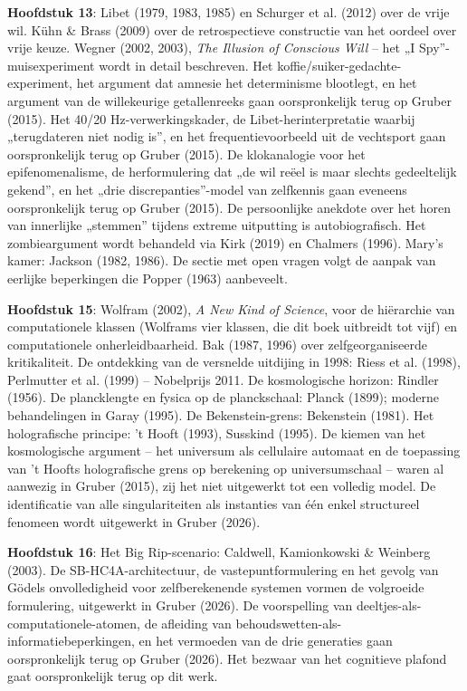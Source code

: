 \documentclass[11pt, twoside, openright]{book}
\begin{document}
\textbf{Hoofdstuk 13}: Libet (1979, 1983, 1985) en Schurger et al. (2012) over de vrije wil. Kühn \& Brass (2009) over de retrospectieve constructie van het oordeel over vrije keuze. Wegner (2002, 2003), \textit{The Illusion of Conscious Will} -- het „I Spy”-muisexperiment wordt in detail beschreven. Het koffie/\allowbreak{}suiker-gedachte-experiment, het argument dat amnesie het determinisme blootlegt, en het argument van de willekeurige getallenreeks gaan oorspronkelijk terug op Gruber (2015). Het 40/\allowbreak{}20 Hz-verwerkingskader, de Libet-herinterpretatie waarbij „terugdateren niet nodig is”, en het frequentievoorbeeld uit de vechtsport gaan oorspronkelijk terug op Gruber (2015). De klokanalogie voor het epifenomenalisme, de herformulering dat „de wil reëel is maar slechts gedeeltelijk gekend”, en het „drie discrepanties”-model van zelfkennis gaan eveneens oorspronkelijk terug op Gruber (2015). De persoonlijke anekdote over het horen van innerlijke „stemmen” tijdens extreme uitputting is autobiografisch. Het zombieargument wordt behandeld via Kirk (2019) en Chalmers (1996). Mary's kamer: Jackson (1982, 1986). De sectie met open vragen volgt de aanpak van eerlijke beperkingen die Popper (1963) aanbeveelt.

\textbf{Hoofdstuk 15}: Wolfram (2002), \textit{A New Kind of Science}, voor de hiërarchie van computationele klassen (Wolframs vier klassen, die dit boek uitbreidt tot vijf) en computationele onherleidbaarheid. Bak (1987, 1996) over zelfgeorganiseerde kritikaliteit. De ontdekking van de versnelde uitdijing in 1998: Riess et al. (1998), Perlmutter et al. (1999) -- Nobelprijs 2011. De kosmologische horizon: Rindler (1956). De plancklengte en fysica op de planckschaal: Planck (1899); moderne behandelingen in Garay (1995). De Bekenstein-grens: Bekenstein (1981). Het holografische principe: 't Hooft (1993), Susskind (1995). De kiemen van het kosmologische argument -- het universum als cellulaire automaat en de toepassing van 't Hoofts holografische grens op berekening op universumschaal -- waren al aanwezig in Gruber (2015), zij het niet uitgewerkt tot een volledig model. De identificatie van alle singulariteiten als instanties van één enkel structureel fenomeen wordt uitgewerkt in Gruber (2026).

\textbf{Hoofdstuk 16}: Het Big Rip-scenario: Caldwell, Kamionkowski \& Weinberg (2003). De SB-HC4A-architectuur, de vastepuntformulering en het gevolg van Gödels onvolledigheid voor zelfberekenende systemen vormen de volgroeide formulering, uitgewerkt in Gruber (2026). De voorspelling van deeltjes-als-computationele-atomen, de afleiding van behoudswetten-als-informatiebeperkingen, en het vermoeden van de drie generaties gaan oorspronkelijk terug op Gruber (2026). Het bezwaar van het cognitieve plafond gaat oorspronkelijk terug op dit werk.
\end{document}
